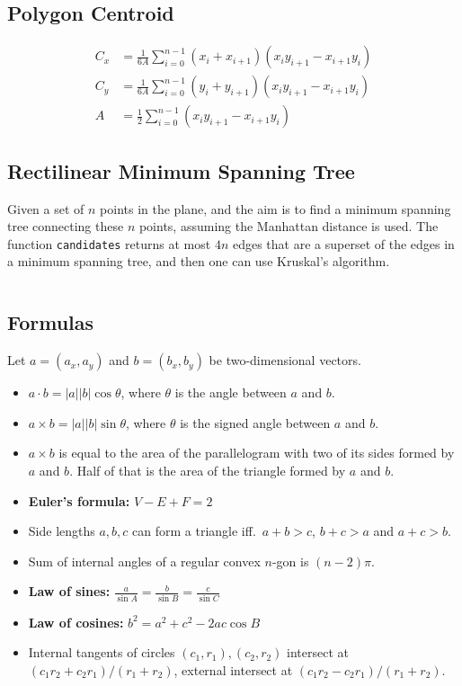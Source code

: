 \documentclass[8pt,a4paper,landscape,oneside]{amsart}
\newcommand{\mintedstyle}[2]{\inputminted[fontsize=\normalsize,baselinestretch=.9,breaklines,tabsize=2]{#1}{code/#2}}
\newcommand{\code}[1]{\mintedstyle{cpp}{#1}}
\begin{document}
\begin{multicols*}{3}
\subsection{Polygon Centroid}
\begin{align*}
  C_x &= \frac{1}{6A}\sum_{i=0}^{n-1}(x_i+x_{i+1})(x_iy_{i+1} - x_{i+1}y_i) \\
  C_y &= \frac{1}{6A}\sum_{i=0}^{n-1}(y_i+y_{i+1})(x_iy_{i+1} - x_{i+1}y_i) \\
  A &= \frac12\sum_{i=0}^{n-1}(x_iy_{i+1}-x_{i+1}y_i)
\end{align*}

\subsection{Rectilinear Minimum Spanning Tree}
Given a set of $n$ points in the plane, and the aim is to find a
minimum spanning tree connecting these $n$ points, assuming the
Manhattan distance is used. The function \texttt{candidates} returns at
most $4n$ edges that are a superset of the edges in a minimum spanning
tree, and then one can use Kruskal's algorithm.
\code{geometry/rmst.cpp}

\subsection{Formulas}
Let $a = (a_x, a_y)$ and $b = (b_x, b_y)$ be two-dimensional vectors.
\begin{itemize}
	\item $a\cdot b = |a||b|\cos{\theta}$, where $\theta$ is the angle
		between $a$ and $b$.
	\item $a\times b = |a||b|\sin{\theta}$, where $\theta$ is the
		signed angle between $a$ and $b$.
	\item $a\times b$ is equal to the area of the parallelogram with
		two of its sides formed by $a$ and $b$. Half of that is the
		area of the triangle formed by $a$ and $b$.
	\item \textbf{Euler's formula:} $V - E + F = 2$
	\item Side lengths $a,b,c$ can form a triangle iff.\ $a+b>c$, $b+c>a$ and $a+c>b$.
	\item Sum of internal angles of a regular convex $n$-gon is $(n-2)\pi$.
	\item \textbf{Law of sines:} $\frac{a}{\sin A} = \frac{b}{\sin B} = \frac{c}{\sin C}$
	\item \textbf{Law of cosines:} $b^2 = a^2 + c^2 - 2ac\cos B$
	\item Internal tangents of circles $(c_1,r_1), (c_2,r_2)$ intersect at $(c_1r_2+c_2r_1)/(r_1+r_2)$, external intersect at $(c_1r_2-c_2r_1)/(r_1+r_2)$.
\end{itemize}


\end{multicols*}
\end{document}
